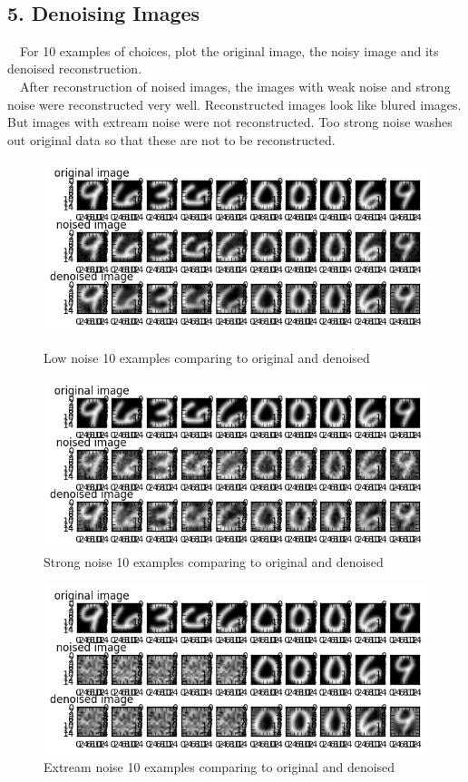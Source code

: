 \documentclass[a4paper,11pt]{article}
\begin{document}
\begin{verbatim}







\end{verbatim}

\subsection*{5. Denoising Images}
~~For 10 examples of choices, plot the
original image, the noisy image and its denoised reconstruction. \\
~~After reconstruction of noised images, the images with weak noise and strong noise were reconstructed very well. Reconstructed images look like blured images. But images with extream noise were not reconstructed. Too strong noise washes out original data so that these are not to be reconstructed.
\begin{figure}[htbp]
  \includegraphics[scale=0.7]{ld.png}
  \caption{Low noise 10 examples comparing to original and denoised}
  \includegraphics[scale=0.7]{sd.png}
  \caption{Strong noise 10 examples comparing to original and denoised}
  \end{figure}
\begin{figure}[htbp]
  \includegraphics[scale=0.7]{ed.png}
  \caption{Extream noise 10 examples comparing to original and denoised}
  \end{figure}
  
\end{document}
